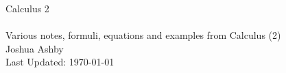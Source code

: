 \begin{titlepage}
\begin{center}
\Huge{\color{BrickRed}Calculus 2}\\[0.5cm]
\hline\\[1.5cm]
\normalsize{\color{Gray}Various notes, formuli, equations and
examples from Calculus (2)}\\[1cm]
\large{\color{Gray}Joshua Ashby}\\
\vfill
Last Updated: \today
\end{center}
\end{titlepage}
